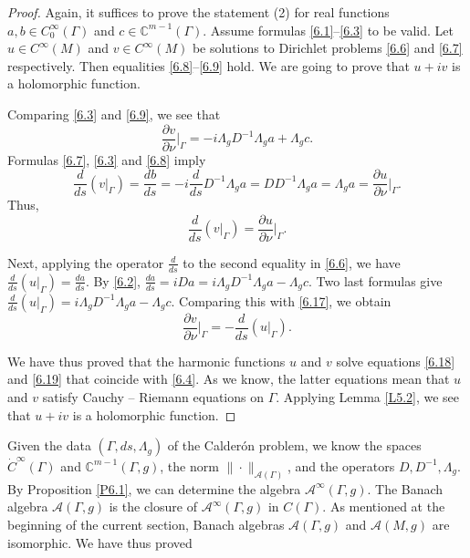 \documentclass[12pt,reqno]{amsart}
\begin{document}
\begin{proof}
Again, it suffices to prove the statement (2) for real functions $a,b\in C^\infty_0(\Gamma)$ and $c\in{\mathbb C}^{m-1}(\Gamma)$. Assume formulas \eqref{6.1}--\eqref{6.3} to be valid. Let $u\in C^\infty(M)$ and $v\in C^\infty(M)$ be solutions to Dirichlet problems \eqref{6.6} and \eqref{6.7} respectively. Then equalities \eqref{6.8}--\eqref{6.9} hold. We are going to prove that $u+iv$ is a holomorphic function.

Comparing \eqref{6.3} and \eqref{6.9}, we see that
\begin{equation}
\frac{\partial v}{\partial\nu}\Big|_\Gamma=-i\Lambda_gD^{-1}\Lambda_ga+\Lambda_gc.
                                \label{6.17}
\end{equation}
Formulas \eqref{6.7}, \eqref{6.3} and \eqref{6.8} imply
$$
\frac{d}{ds}(v|_\Gamma)=\frac{db}{ds}=-i\frac{d}{ds}D^{-1}\Lambda_ga=DD^{-1}\Lambda_ga
=\Lambda_ga=\frac{\partial u}{\partial\nu}\Big|_\Gamma.
$$
Thus,
\begin{equation}
\frac{d}{ds}(v|_\Gamma)=\frac{\partial u}{\partial\nu}\Big|_\Gamma.
                                \label{6.18}
\end{equation}

Next, applying the operator $\frac{d}{ds}$ to the second equality in \eqref{6.6}, we have
$
\frac{d}{ds}(u|_\Gamma)=\frac{da}{ds}.
$
By \eqref{6.2},
$
\frac{da}{ds}=iDa=i\Lambda_gD^{-1}\Lambda_ga-\Lambda_gc.
$
Two last formulas give
$
\frac{d}{ds}(u|_\Gamma)=i\Lambda_gD^{-1}\Lambda_ga-\Lambda_gc.
$
Comparing this with \eqref{6.17}, we obtain
\begin{equation}
\frac{\partial v}{\partial\nu}\Big|_\Gamma=-\frac{d}{ds}(u|_\Gamma).
                                \label{6.19}
\end{equation}

We have thus proved that the harmonic functions $u$ and $v$ solve equations \eqref{6.18} and \eqref{6.19} that coincide with \eqref{6.4}. As we know, the latter equations mean that $u$ and $v$ satisfy Cauchy -- Riemann equations on $\Gamma$. Applying Lemma \ref{L5.2}, we see that $u+iv$ is a holomorphic function.
\end{proof}

Given the data $(\Gamma,ds,\Lambda_g)$ of the Calder\'{o}n problem, we know the spaces $\dot C^\infty(\Gamma)$ and ${\mathbb C}^{m-1}(\Gamma,g)$, the norm $\|\cdot\|_{{\mathcal A}(\Gamma)}$, and the operators $D,D^{-1},\Lambda_g$. By Proposition \ref{P6.1}, we can determine the algebra ${\mathcal A}^\infty(\Gamma,g)$. The Banach algebra ${\mathcal A}(\Gamma,g)$ is the closure of ${\mathcal A}^\infty(\Gamma,g)$ in $C(\Gamma)$. As mentioned at the beginning of the current section, Banach algebras ${\mathcal A}(\Gamma,g)$ and ${\mathcal A}(M,g)$ are isomorphic. We have thus proved
\end{document}

